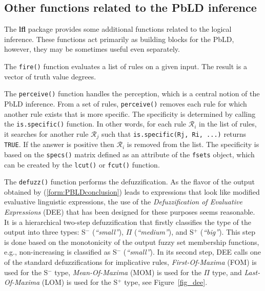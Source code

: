 \documentclass[review]{elsarticle}
\newcommand{\pkg}[1]{\textbf{#1}}
\newcommand{\code}[1]{\texttt{#1}}
\begin{document}
\subsection{Other functions related to the PbLD inference}\label{sec:PbLd_other_func}

The \pkg{lfl} package provides some additional functions related to the logical inference. These functions act primarily as building blocks for the PbLD, however, they may be sometimes useful even separately.

The \code{fire()} function evaluates a list of rules on a given input. The result is a vector of truth value degrees.
%
%
%



The \code{perceive()} function handles the perception, which is a central notion of the PbLD inference. From a set of rules, \code{perceive()} removes each rule for which another rule exists that is more specific. The specificity is determined by calling the \code{is.specific()} function. In other words, for each rule $\mathcal{R}_i$ in the list of rules, it searches for another rule $\mathcal{R}_j$ such that \code{is.specific(Rj, Ri, ...)} returns \code{TRUE}. If the answer is positive then $\mathcal{R}_i$ is removed from the list. The specificity is based on the \code{specs()} matrix defined as an attribute of the \code{fsets} object, which can be created by the \code{lcut()} or \code{fcut()} function.

The \code{defuzz()} function performs the defuzzification. As the flavor of the output obtained by (\ref{form:PBLDconclusion}) leads to expressions that look like modified evaluative linguistic expressions, the use of the \emph{Defuzzification of Evaluative Expressions} (DEE) that has been designed for these purposes seems reasonable. It is a hierarchical two-step defuzzification that firstly classifies the type of the output  into three types: S$^-$ (\emph{``small''}), $\Pi$ (\emph{``medium''}), and S$^+$ (\emph{``big''}). This step is done based on the monotonicity of the output fuzzy set membership functions, e.g., non-increasing is  classified as S$^-$ (\emph{``small''}). In its second step, DEE calls one of the standard defuzzifications for implicative rules, \emph{First-Of-Maxima} (FOM) is used for the S$^-$ type,
\emph{Mean-Of-Maxima} (MOM) is used for the $\Pi$ type, and \emph{Last-Of-Maxima} (LOM) is used for the S$^+$ type, see Figure~\ref{fig_dee}. 
\end{document}
